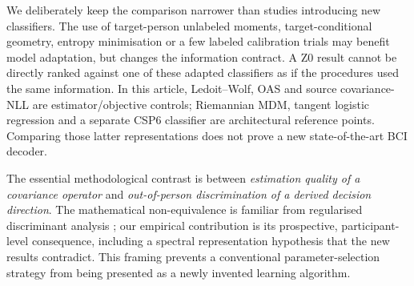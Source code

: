 We deliberately keep the comparison narrower than studies introducing
new classifiers. The use of target-person unlabeled moments,
target-conditional geometry, entropy minimisation or a few labeled
calibration trials may benefit model adaptation, but changes the
information contract. A Z0 result cannot be directly ranked against
one of these adapted classifiers as if the procedures used the same
information. In this article, Ledoit--Wolf, OAS and source
covariance-NLL are estimator/objective controls; Riemannian MDM,
tangent logistic regression and a separate CSP6 classifier
are architectural reference points. Comparing those latter
representations does not prove a new state-of-the-art BCI decoder.

The essential methodological contrast is between \emph{estimation
quality of a covariance operator} and \emph{out-of-person
discrimination of a derived decision direction}. The mathematical
non-equivalence is familiar from regularised discriminant analysis
\cite{friedman1989}; our empirical contribution is its prospective,
participant-level consequence, including a spectral representation
hypothesis that the new results contradict. This framing prevents
a conventional parameter-selection strategy from being presented
as a newly invented learning algorithm.
